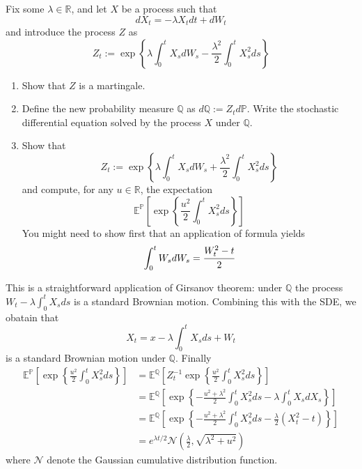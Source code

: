 \documentclass[12pt,a4paper]{exam}
\begin{document}
\begin{questions}
\begin{solution}
\begin{solution}
\question Fix some $\lambda\in\mathbb{R}$, and let $X$ be a process such that
\begin{equation*}
dX_t = -\lambda X_t dt + dW_t
\end{equation*}
and introduce the process $Z$ as 
\begin{equation*}
Z_t := \exp\left\{\lambda\int_0^t X_s dW_s - \frac{\lambda^2}{2}\int_0^t X_s^2 ds\right\}
\end{equation*}
\begin{enumerate}[label=(\alph*),font=\itshape]
\item Show that $Z$ is a martingale.
\item Define the new probability measure $\mathbb{Q}$ as $d\mathbb{Q}:=Z_td\mathbb{P}$. Write the stochastic differential equation solved by the process $X$ under $\mathbb{Q}$.
\item Show that 
\begin{equation*}
Z_t := \exp\left\{\lambda\int_0^t X_s dW_s + \frac{\lambda^2}{2}\int_0^t X_s^2 ds\right\}
\end{equation*}
and compute, for any $u\in\mathbb{R}$, the expectation
\begin{equation*}
\mathbb{E}^{\mathbb{P}}\left[\exp\left\{\frac{u^2}{2}\int_0^t X_s^2 ds\right\}\right]
\end{equation*}
You might need to show first that an application of \ito formula yields
\begin{equation*}
\int_0^t W_s dW_s = \cfrac{W_t^2-t}{2}
\end{equation*}
\end{enumerate}
\fillwithlines{3cm}

\begin{solution}
This is a straightforward application of Girsanov theorem: under $\mathbb{Q}$ the process $W_t -\lambda\int_0^tX_s ds$ is a standard Brownian motion. Combining this with the SDE, we obatain that 
\begin{equation*}
X_t = x -\lambda\int_0^t X_s ds + W_t
\end{equation*}
is a standard Brownian motion under $\mathbb{Q}$. Finally
\begin{equation*}
\begin{aligned}
\mathbb{E}^{\mathbb{P}}\left[\exp\left\{\frac{u^2}{2}\int_0^t X_s^2 ds\right\}\right] &= \mathbb{E}^{\mathbb{Q}}\left[Z_t^{-1}\exp\left\{\frac{u^2}{2}\int_0^t X_s^2 ds\right\}\right] \\
 &= \mathbb{E}^{\mathbb{Q}}\left[\exp\left\{-\frac{u^2+\lambda^2}{2}\int_0^t X_s^2 ds-\lambda\int_0^t X_s dX_s \right\}\right] \\
 &= \mathbb{E}^{\mathbb{Q}}\left[\exp\left\{-\frac{u^2+\lambda^2}{2}\int_0^t X_s^2 ds-\frac{\lambda}{2}(X_t^2-t)\right\}\right] \\
 &= e^{\lambda t/2}\mathcal{N}\left(\frac{\lambda}{2}, \sqrt{\lambda^2 + u^2}\right)
\end{aligned}
\end{equation*}
where $\mathcal{N}$ denote the Gaussian cumulative distribution function.
\end{solution}


\end{solution}
\end{solution}
\end{questions}
\end{document}
